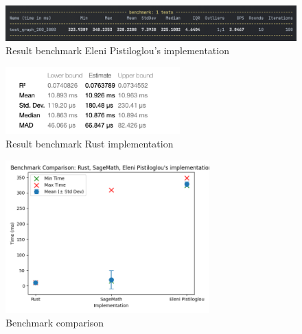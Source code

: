 \begin{figure}[!h]
    \centering
    \includegraphics[width=1\textwidth]{images/benchmark/graph_200_3880/benchmark_graph_200_3880_python}
    \caption{Result benchmark Eleni Pistiloglou's implementation}
    \label{fig:benchmark-graph-200-3880-python}
\end{figure}

\begin{figure}[!h]
    \centering
    \includegraphics[width=0.60\textwidth]{images/benchmark/graph_200_3880/benchmark_graph_200_3880_rust}
    \caption{Result benchmark Rust implementation}
    \label{fig:benchmark-graph-200-3880-rust}
\end{figure}

\begin{figure}[!h]
    \centering
    \includegraphics[width=0.70\textwidth]{images/benchmark/graph_200_3880/benchmark_comparison_graph_200_3880}
    \caption{Benchmark comparison}
    \label{fig:benchmark-comparison-graph-200-3880}
\end{figure}


